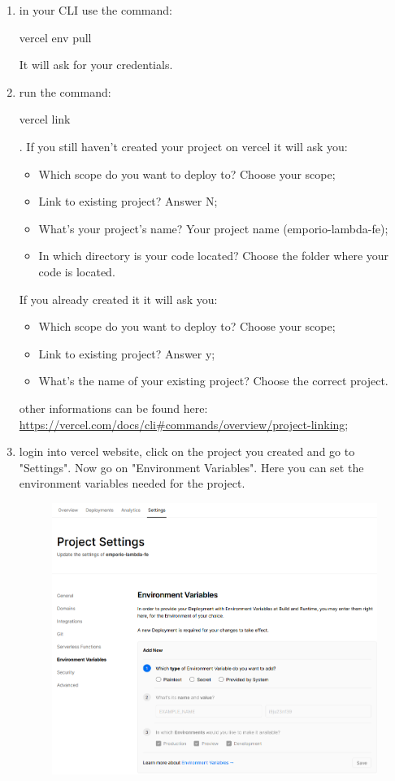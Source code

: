 \begin{enumerate}
\item in your CLI use the command:\begin{center}vercel env pull\end{center}It will ask for your credentials.
\item run the command:\begin{center}vercel link\end{center}. If you still haven't created your project on vercel it will ask you:
\begin{itemize}
\item Which scope do you want to deploy to? Choose your scope;
\item Link to existing project? Answer N;
\item What’s your project’s name? Your project name (emporio-lambda-fe);
\item In which directory is your code located? Choose the folder where your code is located.
\end{itemize}
If you already created it it will ask you:
\begin{itemize}
\item Which scope do you want to deploy to? Choose your scope;
\item Link to existing project? Answer y;
\item What’s the name of your existing project? Choose the correct project.
\end{itemize}
other informations can be found here: \url{https://vercel.com/docs/cli\#commands/overview/project-linking};
\item login into vercel website, click on the project you created and go to "Settings". Now go on "Environment Variables". Here you can set the environment variables needed for the project.\\
\begin{figure}[H]
\centering
\includegraphics[scale=0.55]{res/Setup/Configurazione/img/settingsEnvVar}\\

\end{figure}
\end{enumerate}
